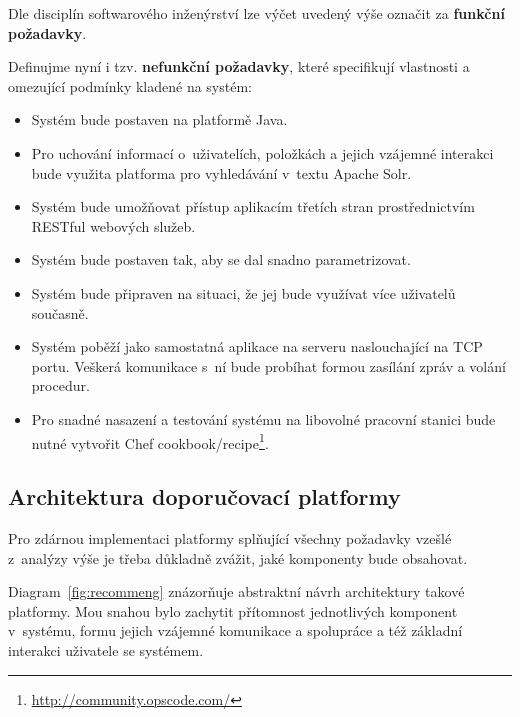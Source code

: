 \documentclass[thesis=M,czech]{FITthesis}[2014/05/07]
\begin{document}
Dle disciplín softwarového inženýrství lze výčet uvedený výše označit za \textbf{funkční požadavky}.

Definujme nyní i tzv. \textbf{nefunkční požadavky}, které specifikují vlastnosti a omezující podmínky kladené na systém:

\begin{itemize}
	\item Systém bude postaven na platformě Java.
	\item Pro uchování informací o~uživatelích, položkách a jejich vzájemné interakci bude využita platforma pro vyhledávání v~textu Apache Solr.
	\item Systém bude umožňovat přístup aplikacím třetích stran prostřednictvím RESTful webových služeb.
	\item Systém bude postaven tak, aby se dal snadno parametrizovat. 
	\item Systém bude připraven na situaci, že jej bude využívat více uživatelů současně.
	\item Systém poběží jako samostatná aplikace na serveru naslouchající na TCP portu. Veškerá komunikace s~ní bude probíhat formou zasílání zpráv a volání procedur.
	\item Pro snadné nasazení a testování systému na libovolné pracovní stanici bude nutné vytvořit Chef cookbook/recipe\footnote{\url{http://community.opscode.com/}}.
\end{itemize}

\subsection{Architektura doporučovací platformy}

Pro zdárnou implementaci platformy splňující všechny požadavky vzešlé z~analýzy výše je třeba důkladně zvážit, jaké komponenty bude obsahovat.

Diagram~\ref{fig:recommeng} znázorňuje abstraktní návrh architektury takové platformy. Mou snahou bylo zachytit přítomnost jednotlivých komponent v~systému, formu jejich vzájemné komunikace a spolupráce a též základní interakci uživatele se systémem.
\end{document}
